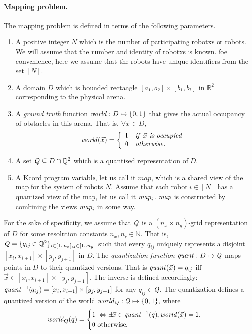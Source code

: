 \paragraph{Mapping problem.}
The mapping problem is defined in terms of the following parameters.
\begin{enumerate}
	\item A positive integer $N$ which is the number of participating robotxs or robots. We will assume that the number and identity of robotxs is known. foe convenience, here we assume that the robots have unique identifiers from the set $[N]$.
	\item A domain $D$ which is bounded rectangle $[a_1,a_2]\times [b_1,b_2]$ in $\mathbb{R}^2$ corresponding to the physical arena.
	\item A \emph{ground truth} function $\mathit{world} : D\mapsto \left\{0,1\right\}$ that gives the actual  occupancy of obstacles in this arena. That is, $\forall \Vec{x} \in D$,
\begin{align}
\mathit{world}(\Vec{x}) =
		\left\{
		\begin{array}{ll}
			1 & \mathit{if}\ \Vec{x} \ \mathit{is \ occupied}\\
			0 & \mathit{otherwise}.
		\end{array}
		\right.
\end{align}
	\item A set $\mathit{Q} \subseteq D \cap \mathbb{Q}^2$ which is a quantized representation of $D$.
	\item A Koord program variable, let us call it $\mathit{map}$, which is a shared view of the map for the system of robots $N$. Assume that each robot $i \in [N]$ has a quantized view of the map, let us call it $\mathit{map}_i$. $\mathit{map}$ is constructed by combining the views $\mathit{map}_i$ in some way.
\end{enumerate}
For the sake of specificity, we assume that $\mathit{Q}$ is a $(n_x\times n_y)$-grid representation of $D$ for some resolution constants $n_x,n_y \in \mathbb{N}$. That is, $\mathit{Q} = \{q_{ij} \in \mathbb{Q}^2\}_{i\in [1..n_x], j\in [1..n_y]}$ such that every $q_{ij}$ uniquely represents a disjoint $[x_i, x_{i+1}] \times [y_j, y_{j+1}]$ in $D$.
%
    The \emph{quantization function}  $\mathit{quant}:D \mapsto \mathit{Q}$ maps points in $D$ to their quantized versions. That is $\mathit{quant}(\Vec{x}) = q_{ij}$ iff $\Vec{x} \in [x_i, x_{i+1}] \times [y_j, y_{j+1}]$.
The inverse is defined accordingly: $\mathit{quant}^{-1}(q_{ij}) =  [x_i, x_{i+1}] \times [y_j, y_{j+1}]$ for any $q_{ij} \in Q$.
%
The quantization defines a quantized version of the world $\mathit{world}_Q : \mathit{Q} \mapsto \left\{0,1\right\}$, where
$$\mathit{world}_Q(q) = \begin{cases}
        1\ \Leftrightarrow \exists \Vec{x}\in \mathit{quant}^{-1}(q), \mathit{world}(\Vec{x}) = 1, \\
        0\ \mbox{otherwise}.
\end{cases}
$$
%

